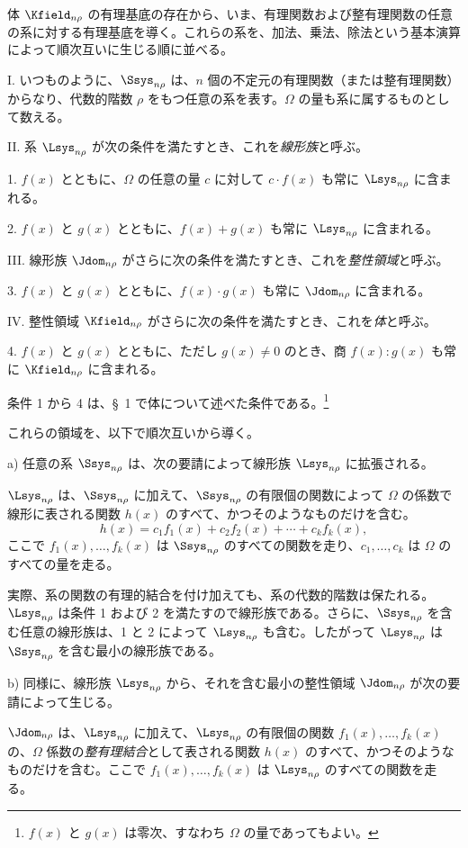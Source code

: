 \documentclass[11pt]{article}
\begin{document}
体 $\Kfield_{n\rho}$ の有理基底の存在から、いま、有理関数および整有理関数の任意の系に対する有理基底を導く。これらの系を、加法、乗法、除法という基本演算によって順次互いに生じる順に並べる。

I. いつものように、$\Ssys_{n\rho}$ は、$n$ 個の不定元の有理関数（または整有理関数）からなり、代数的階数 $\rho$ をもつ任意の系を表す。$\Omega$ の量も系に属するものとして数える。

II. 系 $\Lsys_{n\rho}$ が次の条件を満たすとき、これを\emph{線形族}と呼ぶ。

1. $f(x)$ とともに、$\Omega$ の任意の量 $c$ に対して $c\cdot f(x)$ も常に $\Lsys_{n\rho}$ に含まれる。

2. $f(x)$ と $g(x)$ とともに、$f(x)+g(x)$ も常に $\Lsys_{n\rho}$ に含まれる。

III. 線形族 $\Jdom_{n\rho}$ がさらに次の条件を満たすとき、これを\emph{整性領域}と呼ぶ。

3. $f(x)$ と $g(x)$ とともに、$f(x)\cdot g(x)$ も常に $\Jdom_{n\rho}$ に含まれる。

IV. 整性領域 $\Kfield_{n\rho}$ がさらに次の条件を満たすとき、これを\emph{体}と呼ぶ。

4. $f(x)$ と $g(x)$ とともに、ただし $g(x)\ne0$ のとき、商 $f(x):g(x)$ も常に $\Kfield_{n\rho}$ に含まれる。

条件 1 から 4 は、\S\ 1 で体について述べた条件である。\footnote{$f(x)$ と $g(x)$ は零次、すなわち $\Omega$ の量であってもよい。}

これらの領域を、以下で順次互いから導く。

a) 任意の系 $\Ssys_{n\rho}$ は、次の要請によって線形族 $\Lsys_{n\rho}$ に拡張される。

$\Lsys_{n\rho}$ は、$\Ssys_{n\rho}$ に加えて、$\Ssys_{n\rho}$ の有限個の関数によって $\Omega$ の係数で線形に表される関数 $h(x)$ のすべて、かつそのようなものだけを含む。
\[
  h(x)=c_1f_1(x)+c_2f_2(x)+\cdots+c_kf_k(x),
\]
ここで $f_1(x),\ldots,f_k(x)$ は $\Ssys_{n\rho}$ のすべての関数を走り、$c_1,\ldots,c_k$ は $\Omega$ のすべての量を走る。

実際、系の関数の有理的結合を付け加えても、系の代数的階数は保たれる。$\Lsys_{n\rho}$ は条件 1 および 2 を満たすので線形族である。さらに、$\Ssys_{n\rho}$ を含む任意の線形族は、1 と 2 によって $\Lsys_{n\rho}$ も含む。したがって $\Lsys_{n\rho}$ は $\Ssys_{n\rho}$ を含む最小の線形族である。

b) 同様に、線形族 $\Lsys_{n\rho}$ から、それを含む最小の整性領域 $\Jdom_{n\rho}$ が次の要請によって生じる。

$\Jdom_{n\rho}$ は、$\Lsys_{n\rho}$ に加えて、$\Lsys_{n\rho}$ の有限個の関数 $f_1(x),\ldots,f_k(x)$ の、$\Omega$ 係数の\emph{整有理結合}として表される関数 $h(x)$ のすべて、かつそのようなものだけを含む。ここで $f_1(x),\ldots,f_k(x)$ は $\Lsys_{n\rho}$ のすべての関数を走る。
\end{document}
